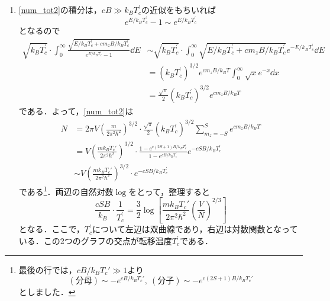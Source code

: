 \documentclass[a4paper,pdflatex,ja=standard]{bxjsarticle}
\begin{document}
\begin{enumerate}
  \item 
  \eqref{num_tot2}の積分は，$cB\gg k_{B}T_{c}^{\prime}$の近似をもちいれば
  \begin{equation}
    e^{E/k_{B}T_{c}^{\prime}}-1
    \sim
    e^{E/k_{B}T_{c}^{\prime}}
  \end{equation}
  となるので
  \begin{align}
    \sqrt{k_{B}T_{c}^{\prime}}\cdot\int_{0}^{\infty}\frac{\sqrt{E/k_{B}T_{c}^{\prime}+cm_{z}B/k_{B}T_{c}^{\prime}}}{e^{E/k_{B}T_{c}^{\prime}}-1}\dd E
    &\sim
    \sqrt{k_{B}T_{c}^{\prime}}\cdot\int_{0}^{\infty}\sqrt{E/k_{B}T_{c}^{\prime}+cm_{z}B/k_{B}T_{c}^{\prime}}e^{-E/k_{B}T_{c}^{\prime}}\dd E
    \nonumber
    \\
    &=
    (k_{B}T_{c}^{\prime})^{3/2}e^{cm_{z}B/k_B T}\int_{0}^{\infty}\sqrt{x}e^{-x}\dd x
    \nonumber
    \\
    &=
    \frac{\sqrt{\pi}}{2}(k_{B}T_{c}^{\prime})^{3/2}e^{cm_{z}B/k_B T}
  \end{align}
  である．よって，\eqref{num_tot2}は
  \begin{align}
    N
    &=
    2\pi V
    \left(  
      \frac{m}{2\pi^2\hbar^2}
    \right)^{3/2}
    \cdot
    \frac{\sqrt{\pi}}{2}(k_{B}T_{c}^{\prime})^{3/2}\sum_{m_z=-S}^{S}e^{cm_{z}B/k_B T}
    \nonumber
    \\
    &=
    V
    \left(  
      \frac{mk_BT_c'}{2\pi^2\hbar^2}
    \right)^{3/2}
    \cdot
    \frac{1-e^{c(2S+1)B/k_{B}T_{c}^{\prime}}}{1-e^{cB/k_{B}T_{c}^{\prime}}}e^{-cSB/k_{B}T_{c}^{\prime}}
    \nonumber
    \\
    &\sim
    V
    \left(  
      \frac{mk_BT_c'}{2\pi^2\hbar^2}
    \right)^{3/2}
    \cdot
    e^{-cSB/k_{B}T_{c}^{\prime}}
  \end{align}
  である\footnote{
    最後の行では，$cB/k_BT_c'\gg 1$より
    $$
      (\text{分母})
      \sim
      -e^{cB/k_BT_c'}
      ,\ 
      (\text{分子})
      \sim
      -e^{c(2S+1)B/k_BT_c'}  
    $$
    としました．
  }．両辺の自然対数$\log$をとって，整理すると
  \begin{equation}
    \frac{cSB}{k_{B}}
    \cdot
    \frac{1}{T_{c}^{\prime}}
    =
    \frac{3}{2}
    \log
    \left[  
      \frac{mk_BT_c'}{2\pi^2\hbar^2}\left( \frac{V}{N} \right)^{2/3}
    \right]
  \end{equation}
  となる．ここで，$T_{c}^{\prime}$について左辺は双曲線であり，右辺は対数関数となっている．この2つのグラフの交点が転移温度$T_{c}^{\prime}$である．
  \begin{figure}[ht]
    \centering    
    \begin{tikzpicture}

\end{tikzpicture}
\end{figure}
\end{enumerate}
\end{document}
